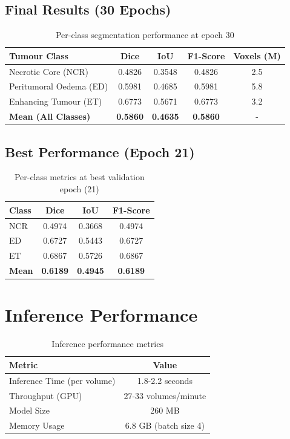 \documentclass{ecsproject}     %
\begin{document}
\subsection{Final Results (30 Epochs)}

\begin{table}[h]
\centering
\begin{tabular}{|l|c|c|c|c|}
\hline
\textbf{Tumour Class} & \textbf{Dice} & \textbf{IoU} & \textbf{F1-Score} & \textbf{Voxels (M)} \\
\hline
Necrotic Core (NCR) & 0.4826 & 0.3548 & 0.4826 & 2.5 \\
Peritumoral Oedema (ED) & 0.5981 & 0.4685 & 0.5981 & 5.8 \\
Enhancing Tumour (ET) & 0.6773 & 0.5671 & 0.6773 & 3.2 \\
\hline
\textbf{Mean (All Classes)} & \textbf{0.5860} & \textbf{0.4635} & \textbf{0.5860} & - \\
\hline
\end{tabular}
\caption{Per-class segmentation performance at epoch 30}
\label{Table:Per_Class}
\end{table}

\subsection{Best Performance (Epoch 21)}

\begin{table}[h]
\centering
\begin{tabular}{|l|c|c|c|}
\hline
\textbf{Class} & \textbf{Dice} & \textbf{IoU} & \textbf{F1-Score} \\
\hline
NCR & 0.4974 & 0.3668 & 0.4974 \\
ED & 0.6727 & 0.5443 & 0.6727 \\
ET & 0.6867 & 0.5726 & 0.6867 \\
\hline
\textbf{Mean} & \textbf{0.6189} & \textbf{0.4945} & \textbf{0.6189} \\
\hline
\end{tabular}
\caption{Per-class metrics at best validation epoch (21)}
\label{Table:Best_Performance}
\end{table}

\section{Inference Performance}

\begin{table}[h]
\centering
\begin{tabular}{|l|c|}
\hline
\textbf{Metric} & \textbf{Value} \\
\hline
Inference Time (per volume) & 1.8-2.2 seconds \\
Throughput (GPU) & 27-33 volumes/minute \\
Model Size & 260 MB \\
Memory Usage & 6.8 GB (batch size 4) \\
\hline
\end{tabular}
\caption{Inference performance metrics}
\label{Table:Inference}
\end{table}
\end{document}
